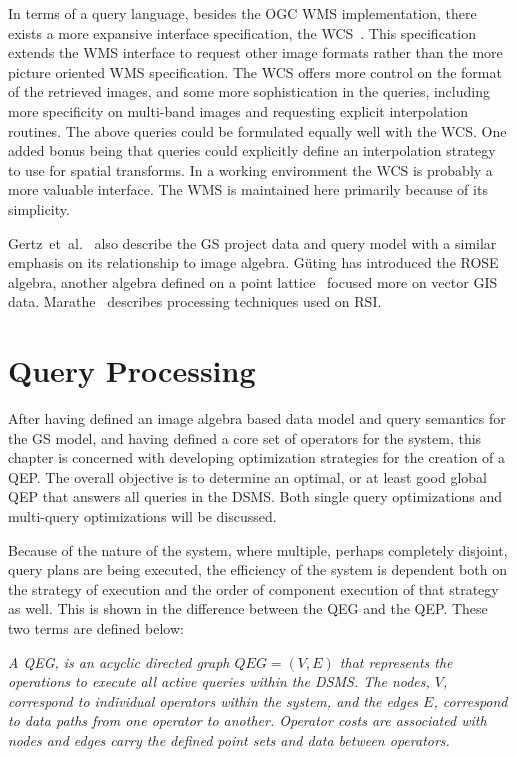 \documentclass{ucdthesis}       %
\begin{document}
In terms of a query language, besides the \ac{OGC} \ac{WMS}
implementation, there exists a more expansive interface specification,
the \acf{WCS}~\cite{evans05web-cover}.  This specification extends the
\ac{WMS} interface to request other image formats rather than the more
picture oriented \ac{WMS} specification.  The \ac{WCS} offers more
control on the format of the retrieved images, and some more
sophistication in the queries, including more specificity on
multi-band images and requesting explicit interpolation routines.  The
above queries could be formulated equally well with the \ac{WCS}.  One
added bonus being that queries could explicitly define an
interpolation strategy to use for spatial transforms.  In a working
environment the \ac{WCS} is probably a more valuable interface.  The
\ac{WMS} is maintained here primarily because of its simplicity.

Gertz~et~al.~\cite{gertz06data-query} also describe the \ac{GS}
project data and query model with a similar emphasis on its
relationship to image algebra.  G\"uting has introduced the ROSE
algebra, another algebra defined on a point
lattice~\cite{gutin95realm-based} focused more on vector \ac{GIS}
data.  Marathe~\cite{marat02query} describes processing techniques
used on \ac{RSI}.

\chapter{Query Processing}
\label{cha:query}

After having defined an image algebra based data model and query
semantics for the \ac{GS} model, and having defined a core set of
operators for the system, this chapter is concerned with developing
optimization strategies for the creation of a \acf{QEP}.  The overall
objective is to determine an optimal, or at least good global \ac{QEP}
that answers all queries in the \ac{DSMS}.  Both single query
optimizations and multi-query optimizations will be discussed.

Because of the nature of the system, where multiple, perhaps
completely disjoint, query plans are being executed, the efficiency of
the system is dependent both on the strategy of execution and the
order of component execution of that strategy as well.  This is shown
in the difference between the \acf{QEG} and the \ac{QEP}.  These two
terms are defined below:

\emph{A \acf{QEG}, is an acyclic directed graph $QEG = (V,E)$ that
  represents the operations to execute all active queries within the
  \acf{DSMS}.  The nodes, $V$, correspond to individual operators
  within the system, and the edges $E$, correspond to data paths from
  one operator to another.  Operator costs are associated with nodes
  and edges carry the defined point sets and data between operators.}
\end{document}
